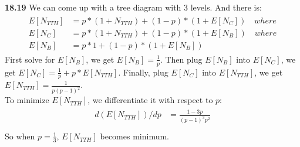 \documentclass[titlepage, paper=a4, fontsize=11pt]{scrartcl} %
\numberwithin{equation}{section} %
\numberwithin{figure}{section} %
\numberwithin{table}{section} %
\begin{document}
\textbf{18.19}
We can come up with a tree diagram with 3 levels. And there is:
\begin{align*} 
\begin{split}
E[N_{TTH}] &= p * (1+N_{TTH}) + (1-p) * (1+E[N_C]) \quad where \\
E[N_C] &= p * (1+N_{TTH}) + (1-p) * (1+E[N_B]) \quad where \\
E[N_B] &= p * 1 + (1-p) * (1+E[N_B])
\end{split}					
\end{align*}
First solve for $E[N_B]$, we get $E[N_B] = \frac{1}{p}$. Then plug $E[N_B]$ into $E[N_C]$, we get
$E[N_C] = \frac{1}{p} + p * E[N_{TTH}]$. Finally, plug $E[N_C]$ into $E[N_{TTH}]$, we get $E[N_{TTH}] = \frac{1}{p(p-1)^2}$. \\
To minimize $E[N_{TTH}]$, we differentiate it with respect to $p$:
\begin{align*} 
\begin{split}
d(E[N_{TTH}])/dp &= \frac{1-3p}{(p-1)^3p^2} \\
\end{split}					
\end{align*}
So when $p=\frac{1}{3}$, $E[N_{TTH}]$ becomes minimum.
\\
\end{document}
